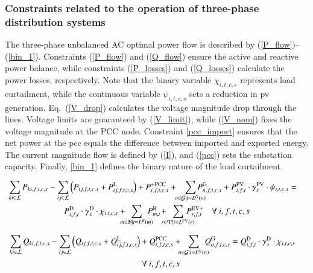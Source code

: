 \documentclass[preprint, 12pt, 3p]{elsarticle}
\begin{document}
\subsubsection{Constraints related to the operation of three-phase distribution systems}

The three-phase unbalanced AC optimal power flow is described by 
(\ref{P_flow})–(\ref{bin_1}). 
Constraints (\ref{P_flow}) and (\ref{Q_flow}) 
ensure the active and reactive power balance, while constraints 
(\ref{P_losses}) and (\ref{Q_losses}) 
calculate the power losses, respectively. Note that the binary variable $\chi_{i,t,c,s}$ represents load curtailment, while the continuous variable $\psi_{i,t,c,s}$ sets a reduction in \gls{pv} generation.
Eq.~(\ref{V_drop}) calculates the voltage magnitude drop through the lines.
Voltage limits are guaranteed by (\ref{V_limit}), while (\ref{V_nom}) 
fixes the voltage magnitude at the PCC node. Constraint \ref{pcc_import} ensures that the net power at the \gls{pcc} equals the difference between imported and exported energy. The current magnitude flow is defined by (\ref{I}), and (\ref{pcc}) sets 
the substation capacity. Finally, \ref{bin_1} defines the binary nature of the load curtailment.

\vspace{-10pt}
\begin{multline}\label{P_flow}
    \hspace{-10pt}\sum_{ki\in \mathcal{L}} P_{ki,f,t,c,s} 
    - \sum_{ij\in \mathcal{L}} \Big(P_{ij,f,t,c,s} + 
    P^{\text{L}}_{ij,f,t,c,s} \Big) + 
    P^{+\text{PCC}}_{i,f,t,c,s} + %
    \!\!\sum_{n\in \mathcal{G} |i=L^G(n)}\!\!\!\!\!\!\! P^{\text{G}}_{n,f,t,c,s} + 
    P^\text{PV}_{i,f,t} \cdot \gamma^{\text{PV}}_{s} \cdot \psi_{i,t,c,s}
    = \\
    P^\text{D}_{i,f,t} \cdot \gamma^{\text{D}}_{s} \cdot \chi_{i,t,c,s}  + %
    \!\!\!\!\!\sum_{m\in \mathcal{B} |i=L^B(m)}\!\!\!\!\! P^{\text{B}}_{m,t}\!  +
    \!\!\!\!\!\sum_{r\in \mathcal{V} |i=L^{\text{EV}}(r)}\!\!\!\!\!\!\! 
        P^{\text{\text{EV}+}}_{r,f,t}
    \quad  \forall \ i,f,t,c,s
\end{multline}
\vspace{-20pt}

\begin{multline}\label{Q_flow}
    \hspace{-10pt}\sum_{ki\in \mathcal{L}} Q_{ki,f,t,c,s} - 
    \sum_{ij\in \mathcal{L}} \Big(Q_{ij,f,t,c,s} + 
    Q^{\text{L}}_{ij,f,t,c,s} \Big) + 
    Q^\text{PCC}_{i,f,t,c,s} + %
    \!\!\!\sum_{n\in \mathcal{G} |i=L^G(n)}\!\!\!\! Q^{\text{G}}_{n,f,t,c,s} = 
    Q^\text{D}_{i,f,t} \cdot \gamma^{\text{D}}_{s} \cdot \chi_{i,t,c,s}  
    \\ \quad \forall \ i,f,t,c,s
\end{multline}
\vspace{-40pt}
  
\end{document}
